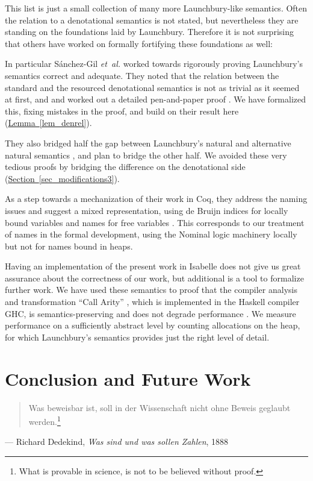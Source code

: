 \documentclass{jfp1}
\newcommand{\myref}[2]{\hyperref[#2]{#1~\ref*{#2}}}
\theoremstyle{nonumberbreak}
\begin{document}
\smallskip

This list is just a small collection of many more Launchbury-like semantics. Often the relation to a denotational semantics is not stated, but nevertheless they are standing on the foundations laid by Launchbury. Therefore it is not surprising that others have worked on formally fortifying these foundations as well:

In particular S{\'a}nchez-Gil {\em et~al.} worked towards rigorously proving Launchbury's semantics correct and adequate. They noted that the relation between the standard and the resourced denotational semantics is not as trivial as it seemed at first, and and worked out a detailed pen-and-paper proof . We have formalized this, fixing mistakes in the proof, and build on their result here (\myref{Lemma}{lem_denrel}).

They also bridged half the gap between Launchbury's natural and alternative natural semantics \cite{indirections}, and plan to bridge the other half. We avoided these very tedious proofs by bridging the difference on the denotational side (\myref{Section}{sec_modifications3}).

As a step towards a mechanization of their work in Coq, they address the naming issues and suggest a mixed representation, using de Bruijn indices for locally bound variables and names for free variables . This corresponds to our treatment of names in the formal development, using the Nominal logic machinery \cite{nominal} locally but not for names bound in heaps.

\smallskip

Having an implementation of the present work in Isabelle does not give us great assurance about the correctness of our work, but additional is a tool to formalize further work. We have used these semantics to proof that the compiler analysis and transformation ``Call Arity'' \cite{tfp}, which is implemented in the Haskell compiler GHC, is semantics-preserving and does not degrade performance \cite{arity-afp}. We measure performance on a sufficiently abstract level by counting allocations on the heap, for which Launchbury’s semantics provides just the right level of detail.


\section{Conclusion and Future Work}

\begin{quote}
Was beweisbar ist, soll in der Wissenschaft nicht ohne Beweis geglaubt werden.\footnote{
What is provable in science, is not to be believed without proof.}
\end{quote}
\begin{qtsource}
--- Richard Dedekind, \textit{Was sind und was sollen Zahlen}, 1888
\end{qtsource}
\end{document}
